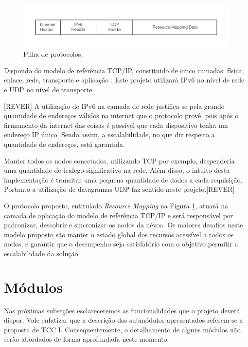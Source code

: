 \begin{figure}[htb!]
    \centering\includegraphics[width=.75\textwidth]{fig2.pdf}
    \caption%
    {\label{fig:fig2} Pilha de protocolos.}
\end{figure}

Dispondo do modelo de referência TCP/IP, constituido de cinco camadas: física, enlace, rede, transporte e aplicação \cite{tanenbaum2011redes}.
Este projeto utilizará IPv6 no nível de rede e UDP no nível de transporte.

[REVER] A utilização de IPv6 na camada de rede justifica-se pela grande quantidade de endereços válidos na internet que o protocolo provê, pois após o firmamento da internet das coisas é possível que cada dispositivo tenha um endereço IP único.
Sendo assim, a escalabilidade, no que diz respeito a quantidade de endereços, está garantida.

Manter todos os nodos conectados, utilizando TCP por exemplo, despenderia uma quantidade de trafego significativo na rede. Além disso, o intuito desta implementação é transitar uma pequena quantidade de dados a cada requisição.
Portanto a utilização de datagramas UDP faz sentido neste projeto.[REVER]

O protocolo proposto, entitulado \textit{Resource Mapping} na Figura \ref{fig:fig2}, atuará na camada de aplicação do modelo de referência TCP/IP \cite{tanenbaum2011redes} e será responsável por padronizar, descobrir e sincronizar os nodos da névoa.
Os maiores desafios neste modelo proposto são manter o estado global dos recursos acessível a todos os nodos, e garantir que o desempenho seja satisfatório com o objetivo permitir a escalabilidade da solução.



\section{Módulos}

Nas próximas subseções esclareceremos as funcionalidades que o projeto deverá dispor.
Vale enfatizar que a descrição dos submódulos apresentados referem-se a proposta de TCC I.
Consequentemente, o detalhamento de alguns módulos não serão abordados de forma aprofundada neste momento.


